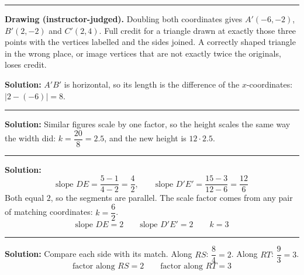 \documentclass[12pt]{article}
\begin{document}
\vspace{0.25cm}

\noindent\rule{\linewidth}{0.2pt}


\textbf{Drawing (instructor-judged).} Doubling both coordinates gives $A'(-6, -2)$, $B'(2, -2)$
and $C'(2, 4)$. Full credit for a triangle drawn at exactly those three points with the vertices
labelled and the sides joined. A correctly shaped triangle in the wrong place, or image vertices
that are not exactly twice the originals, loses credit.

\textbf{Solution:} \quad $A'B'$ is horizontal, so its length is the difference of the
$x$-coordinates: $|2 - (-6)| = 8$. 

\vspace{0.25cm}

\noindent\rule{\linewidth}{0.2pt}


\textbf{Solution:} \quad Similar figures scale by one factor, so the height scales the same way
the width did: $k = \dfrac{20}{8} = 2.5$, and the new height is $12 \cdot 2.5$.

\vspace{0.25cm}

\noindent\rule{\linewidth}{0.2pt}


\textbf{Solution:} \quad
\[ \text{slope } DE = \frac{5-1}{4-2} = \frac{4}{2}, \qquad
   \text{slope } D'E' = \frac{15-3}{12-6} = \frac{12}{6} \]
Both equal $2$, so the segments are parallel. The scale factor comes from any pair of matching
coordinates: $k = \dfrac{6}{2}$.
\[ \boxed{\text{slope } DE = 2 \qquad \text{slope } D'E' = 2 \qquad k = 3} \]

\vspace{0.25cm}

\noindent\rule{\linewidth}{0.2pt}


\textbf{Solution:} \quad Compare each side with its match. Along $RS$: $\dfrac{8}{4} = 2$. Along
$RT$: $\dfrac{9}{3} = 3$.
\[ \boxed{\text{factor along } RS = 2 \qquad \text{factor along } RT = 3} \]
\end{document}

